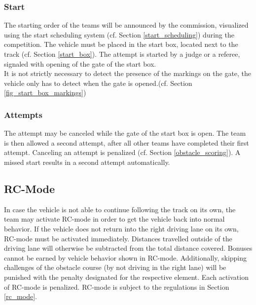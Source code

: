\documentclass[a4paper]{report}
\begin{document}
\subsubsection{Start}

The starting order of the teams will be announced by the commission, visualized
using the start scheduling system (cf. Section \ref{start_scheduling}) during
the competition. The vehicle must be placed in the start box, located next to
the track (cf. Section \ref{start_box}). The attempt is started by a judge or a
referee, signaled with opening of the gate of the start box.\\ It is not
strictly necessary to detect the presence of the markings on the gate, the
vehicle only has to detect when the gate is opened.(cf. Section
\ref{fig_start_box_markings})

\subsubsection{Attempts}

The attempt may be canceled while the gate of the start box is open. The team
is then allowed a second attempt, after all other teams have completed their
first attempt. Canceling an attempt is penalized (cf. Section
\ref{obstacle_scoring}). A missed start results in a second attempt
automatically.

\subsection{RC-Mode}

In case the vehicle is not able to continue following the track on its own, the
team may activate RC-mode in order to get the vehicle back into normal
behavior. If the vehicle does not return into the right driving lane on its
own, RC-mode must be activated immediately. Distances travelled outside of the
driving lane will otherwise be subtracted from the total distance covered.
Bonuses cannot be earned by vehicle behavior shown in RC-mode. Additionally,
skipping challenges of the obstacle course (by not driving in the right lane)
will be punished with the penalty designated for the respective element. Each
activation of RC-mode is penalized. RC-mode is subject to the regulations in
Section \ref{rc_mode}.
\end{document}
